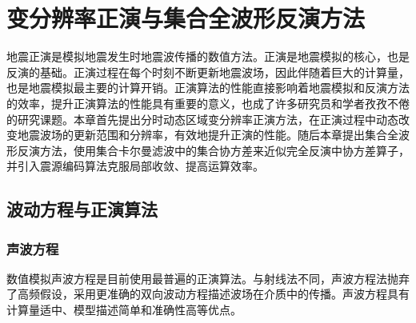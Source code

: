 \chapter{变分辨率正演与集合全波形反演方法} %
\label{cha:变分辨率正演与集合全波形反演方法}

地震正演是模拟地震发生时地震波传播的数值方法。正演是地震模拟的核心，也是反演的基础。正演过程在每个时刻不断更新地震波场，因此伴随着巨大的计算量，也是地震模拟最主要的计算开销。正演算法的性能直接影响着地震模拟和反演方法的效率，提升正演算法的性能具有重要的意义，也成了许多研究员和学者孜孜不倦的研究课题\cite{bednar2002limited,stork2013eliminating}。本章首先提出分时动态区域变分辨率正演方法，在正演过程中动态改变地震波场的更新范围和分辨率，有效地提升正演的性能。随后本章提出集合全波形反演方法，使用集合卡尔曼滤波中的集合协方差来近似完全反演中协方差算子，并引入震源编码算法克服局部收敛、提高运算效率。


\section{波动方程与正演算法} %

\subsection{声波方程} %
数值模拟声波方程是目前使用最普遍的正演算法。与射线法不同，声波方程法抛弃了高频假设，采用更准确的双向波动方程描述波场在介质中的传播。声波方程具有计算量适中、模型描述简单和准确性高等优点。

